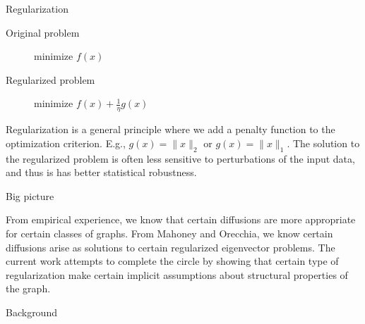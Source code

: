 \documentclass[xcolor=dvipsnames]{beamer}
\begin{document}
\begin{frame}
  \begin{block}{Regularization}
  \begin{description}
    \item[Original problem] minimize $f(x)$
    \item[Regularized problem] minimize $f(x) + \frac{1}{\eta} g(x)$
  \end{description}
  \end{block}

  Regularization is a general principle where we add a penalty function to
  the optimization criterion.  E.g., $g(x) = \|x\|_2$ or $g(x) = \|x\|_1$.
  The solution to the regularized problem is
  often less sensitive to perturbations of the input data, and thus is
  has better statistical robustness.
\end{frame}

\begin{frame}
\centering
{\Large Big picture}
\vspace{-4em}

From empirical experience, we know that certain diffusions are more
appropriate for certain classes of graphs.
From Mahoney and Orecchia, we know certain diffusions arise as solutions
to certain regularized eigenvector problems.
The current work attempts to complete the circle by showing that certain 
type of regularization make certain implicit assumptions about structural
properties of the graph.
\end{frame}


\begin{frame}[c]
  \begin{block}{}
  \begin{center}
    \huge{Background}
  \end{center}
  \end{block}
\end{frame}
\end{document}

